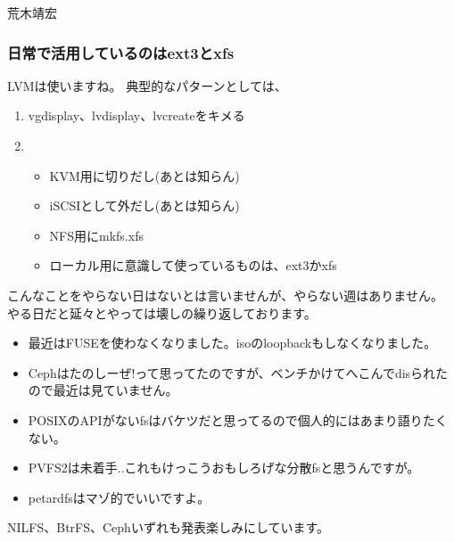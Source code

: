 \begin{prework}{ 荒木靖宏 }
\subsubsection{日常で活用しているのはext3とxfs}

LVMは使いますね。
典型的なパターンとしては、

\begin{enumerate}
\item vgdisplay、lvdisplay、lvcreateをキメる
\item 
  \begin{itemize} 
    \item KVM用に切りだし(あとは知らん)
    \item iSCSIとして外だし(あとは知らん)
    \item NFS用にmkfs.xfs
    \item ローカル用に意識して使っているものは、ext3かxfs
  \end{itemize}
\end{enumerate}

こんなことをやらない日はないとは言いませんが、やらない週はありません。
やる日だと延々とやっては壊しの繰り返しております。

\begin{itemize}
\item 最近はFUSEを使わなくなりました。isoのloopbackもしなくなりました。
\item Cephはたのしーぜ!って思ってたのですが、ベンチかけてへこんでdisられたので最近は見ていません。
\item POSIXのAPIがないfsはバケツだと思ってるので個人的にはあまり語りたくない。
\item PVFS2は未着手..これもけっこうおもしろげな分散fsと思うんですが。
\item petardfsはマゾ的でいいですよ。
\end{itemize}

NILFS、BtrFS、Cephいずれも発表楽しみにしています。

\end{prework}
